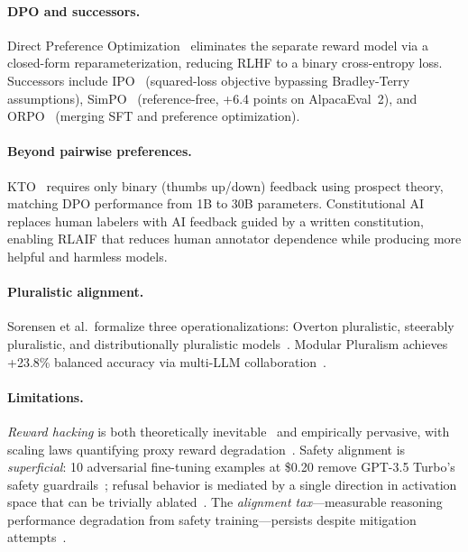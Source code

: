 \paragraph{DPO and successors.}
Direct Preference Optimization~\cite{rafailov2023dpo} eliminates the separate reward model via a closed-form reparameterization, reducing RLHF to a binary cross-entropy loss. Successors include IPO~\cite{azar2024ipo} (squared-loss objective bypassing Bradley-Terry assumptions), SimPO~\cite{meng2024simpo} (reference-free, +6.4 points on AlpacaEval~2), and ORPO~\cite{hong2024orpo} (merging SFT and preference optimization).

\paragraph{Beyond pairwise preferences.}
KTO~\cite{ethayarajh2024kto} requires only binary (thumbs up/down) feedback using prospect theory, matching DPO performance from 1B to 30B parameters. Constitutional AI~\cite{bai2022constitutionalai} replaces human labelers with AI feedback guided by a written constitution, enabling RLAIF that reduces human annotator dependence while producing more helpful and harmless models.

\paragraph{Pluralistic alignment.}
Sorensen et al.\ formalize three operationalizations: Overton pluralistic, steerably pluralistic, and distributionally pluralistic models~\cite{sorensen2024pluralistic}. Modular Pluralism achieves +23.8\% balanced accuracy via multi-LLM collaboration~\cite{feng2024modular}.

\paragraph{Limitations.}
\emph{Reward hacking} is both theoretically inevitable~\cite{skalse2022rewardhacking} and empirically pervasive, with scaling laws quantifying proxy reward degradation~\cite{gao2023scalinglaws}. Safety alignment is \emph{superficial}: 10 adversarial fine-tuning examples at \$0.20 remove GPT-3.5 Turbo's safety guardrails~\cite{qi2024finetuning}; refusal behavior is mediated by a single direction in activation space that can be trivially ablated~\cite{arditi2024refusal}. The \emph{alignment tax}---measurable reasoning performance degradation from safety training---persists despite mitigation attempts~\cite{huang2025safetytax}.


